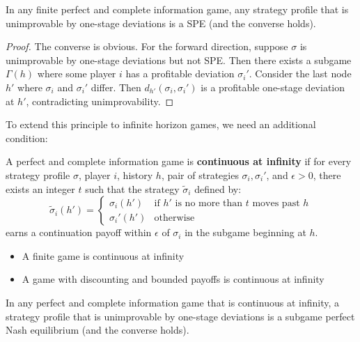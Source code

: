 \documentclass[11pt]{elegantbook_2}
\begin{document}
\begin{proposition}
In any finite perfect and complete information game, any strategy profile that is unimprovable by one-stage deviations is a SPE (and the converse holds).
\end{proposition}

\begin{proof}
The converse is obvious. For the forward direction, suppose $\sigma$ is unimprovable by one-stage deviations but not SPE. Then there exists a subgame $\Gamma(h)$ where some player $i$ has a profitable deviation $\sigma_i'$. Consider the last node $h'$ where $\sigma_i$ and $\sigma_i'$ differ. Then $d_{h'}(\sigma_i,\sigma_i')$ is a profitable one-stage deviation at $h'$, contradicting unimprovability.
\end{proof}

To extend this principle to infinite horizon games, we need an additional condition:

\begin{definition}
A perfect and complete information game is \textbf{continuous at infinity} if for every strategy profile $\sigma$, player $i$, history $h$, pair of strategies $\sigma_i,\sigma_i'$, and $\epsilon>0$, there exists an integer $t$ such that the strategy $\tilde{\sigma}_i$ defined by:
$$\tilde{\sigma}_i(h') = \begin{cases}
\sigma_i(h') & \text{if $h'$ is no more than $t$ moves past $h$}\\
\sigma_i'(h') & \text{otherwise}
\end{cases}$$
earns a continuation payoff within $\epsilon$ of $\sigma_i$ in the subgame beginning at $h$.
\end{definition}

\begin{remark}
\begin{itemize}
\item A finite game is continuous at infinity
\item A game with discounting and bounded payoffs is continuous at infinity
\end{itemize}
\end{remark}

\begin{proposition}
In any perfect and complete information game that is continuous at infinity, a strategy profile that is unimprovable by one-stage deviations is a subgame perfect Nash equilibrium (and the converse holds).
\end{proposition}
\end{document}
